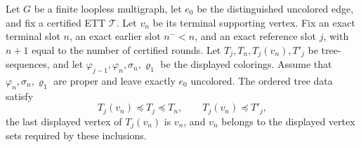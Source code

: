 \begin{lemma}
Let \(G\) be a finite loopless multigraph, let \(e_0\) be the distinguished
uncolored edge, and fix a certified ETT \(\mathcal T\).  Let \(v_n\) be its
terminal supporting vertex.  Fix an exact terminal slot \(n\), an exact
earlier slot \(n^-<n\), and an exact reference slot \(j\), with \(n+1\)
equal to the number of certified rounds.  Let
\(T_j,T_n,T_j(v_n),T'_j\) be tree-sequences, and let
\(\varphi_{j-1},\varphi_n,\sigma_n,\varrho_1\) be the displayed colorings.
Assume that \(\varphi_n,\sigma_n,\varrho_1\) are proper and leave exactly
\(e_0\) uncolored.  The ordered tree data satisfy
\[
 T_j(v_n)\preccurlyeq T_j\preccurlyeq T_n,\qquad
 T_j(v_n)\preccurlyeq T'_j,
\]
the last displayed vertex of \(T_j(v_n)\) is \(v_n\), and \(v_n\) belongs
to the displayed vertex sets required by these inclusions.


\end{lemma}
